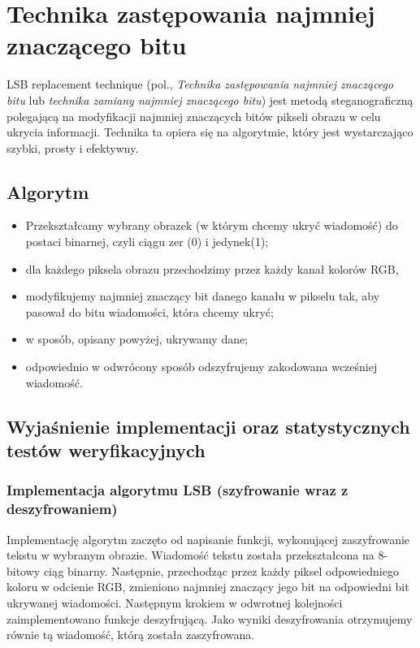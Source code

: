 \section{Technika zastępowania najmniej znaczącego bitu}
LSB replacement technique (pol., \textit{Technika zastępowania najmniej znaczącego bitu} lub \textit{technika zamiany najmniej znaczącego bitu}) jest metodą steganograficzną polegającą na modyfikacji najmniej znaczących bitów pikseli obrazu w celu ukrycia informacji. Technika ta opiera się na algorytmie, który jest wystarczająco szybki, prosty i efektywny.

\subsection{Algorytm}
\begin{itemize}
    \item Przekształcamy wybrany obrazek (w którym chcemy ukryć wiadomość) do postaci binarnej, czyli ciągu zer (0) i jedynek(1);
    \item dla każdego piksela obrazu przechodzimy przez każdy kanał kolorów RGB,
    \item modyfikujemy najmniej znaczący bit danego kanału w pikselu tak, aby pasował do bitu wiadomości, która chcemy ukryć;
    \item w sposób, opisany powyżej, ukrywamy dane;
    \item odpowiednio w odwrócony sposób odszyfrujemy zakodowana wcześniej wiadomość.
\end{itemize}

\subsection{Wyjaśnienie implementacji oraz statystycznych testów weryfikacyjnych}

\subsubsection{Implementacja algorytmu LSB (szyfrowanie wraz z deszyfrowaniem)}

Implementację algorytm zaczęto od napisanie funkcji, wykonującej zaszyfrowanie tekstu w wybranym obrazie. Wiadomość tekstu została przekształcona na 8-bitowy ciąg binarny. Następnie, przechodząc przez każdy piksel odpowiedniego koloru w odcienie RGB, zmieniono najmniej znaczący jego bit na odpowiedni bit ukrywanej wiadomości.
Następnym krokiem w odwrotnej kolejności zaimplementowano funkcje deszyfrującą. Jako wyniki deszyfrowania otrzymujemy równie tą wiadomość, którą została zaszyfrowana.


